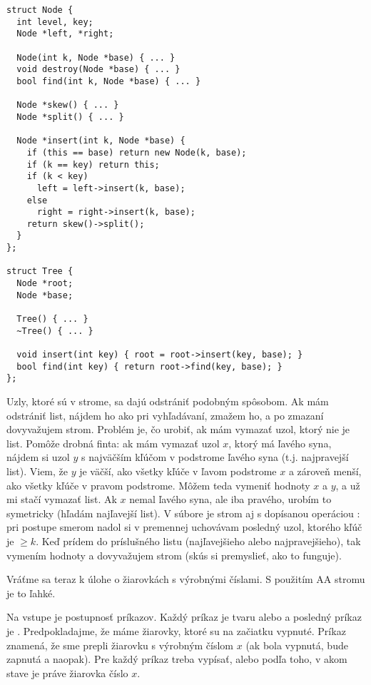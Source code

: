 \begin{lstlisting}
struct Node {
  int level, key;
  Node *left, *right;

  Node(int k, Node *base) { ... }
  void destroy(Node *base) { ... }
  bool find(int k, Node *base) { ... }
  
  Node *skew() { ... }
  Node *split() { ... }

  Node *insert(int k, Node *base) {
    if (this == base) return new Node(k, base);
    if (k == key) return this;
    if (k < key)
      left = left->insert(k, base);
    else
      right = right->insert(k, base);
    return skew()->split();
  }
};

struct Tree {
  Node *root;
  Node *base;

  Tree() { ... }
  ~Tree() { ... }

  void insert(int key) { root = root->insert(key, base); }
  bool find(int key) { return root->find(key, base); }
};

\end{lstlisting}


Uzly, ktoré sú v strome, sa dajú odstrániť podobným spôsobom. Ak mám odstrániť list,
nájdem ho ako pri vyhľadávaní, zmažem ho, a po zmazaní dovyvažujem strom. Problém je,
čo urobiť, ak mám vymazať uzol, ktorý nie je list. Pomôže drobná finta: ak mám
vymazať uzol $x$, ktorý má ľavého syna, nájdem si uzol $y$ s najväčším kľúčom v podstrome
ľavého syna (t.j. najpravejší list). Viem, že $y$ je väčší, ako všetky kľúče v ľavom podstrome
$x$ a zároveň menší, ako všetky kľúče v pravom podstrome. Môžem teda vymeniť hodnoty
$x$ a $y$, a už mi stačí vymazať list. Ak $x$ nemal ľavého syna, ale iba pravého, 
urobím to symetricky (hľadám najľavejší list). V súbore 
je strom aj s dopísanou operáciou : pri postupe smerom nadol
si v premennej  uchovávam posledný uzol, ktorého kľúč je $\ge k$. Keď
prídem do príslušného listu (najľavejšieho alebo najpravejšieho), tak vymením
hodnoty a dovyvažujem strom (skús si premyslieť, ako to funguje).


Vráťme sa teraz k úlohe o žiarovkách s výrobnými číslami.
S použitím AA stromu je to ľahké.

\begin{uloha}
  \label{uloha:ziarovky-vela}
  Na vstupe je  postupnosť príkazov. Každý príkaz je tvaru
   alebo  a posledný príkaz je \vb{\#}. 
  Predpokladajme, že máme žiarovky, 
  ktoré su na začiatku vypnuté. Príkaz  znamená, že sme prepli žiarovku
  s výrobným číslom $x$ (ak bola vypnutá, bude zapnutá a naopak). Pre každý príkaz 
  treba vypísať,  alebo  podľa toho, v akom stave je práve žiarovka
  číslo $x$.
\end{uloha}

